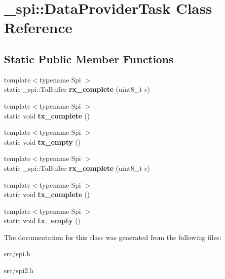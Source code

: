 \hypertarget{class__spi_1_1DataProviderTask}{}\section{\+\_\+spi\+:\+:Data\+Provider\+Task Class Reference}
\label{class__spi_1_1DataProviderTask}
\subsection*{Static Public Member Functions}
\begin{DoxyCompactItemize}
\item 
\hypertarget{class__spi_1_1DataProviderTask_a5f3759905dd157be3c7b42b1f77c160c}{}\label{class__spi_1_1DataProviderTask_a5f3759905dd157be3c7b42b1f77c160c} 
{\footnotesize template$<$typename Spi $>$ }\\static \+\_\+spi\+::\+To\+Buffer {\bfseries rx\+\_\+complete} (uint8\+\_\+t c)
\item 
\hypertarget{class__spi_1_1DataProviderTask_a3211b16d267b3e977ebf44e7158cca61}{}\label{class__spi_1_1DataProviderTask_a3211b16d267b3e977ebf44e7158cca61} 
{\footnotesize template$<$typename Spi $>$ }\\static void {\bfseries tx\+\_\+complete} ()
\item 
\hypertarget{class__spi_1_1DataProviderTask_ad9812d5db693664f54bcaee1152e4d6b}{}\label{class__spi_1_1DataProviderTask_ad9812d5db693664f54bcaee1152e4d6b} 
{\footnotesize template$<$typename Spi $>$ }\\static void {\bfseries tx\+\_\+empty} ()
\item 
\hypertarget{class__spi_1_1DataProviderTask_a5f3759905dd157be3c7b42b1f77c160c}{}\label{class__spi_1_1DataProviderTask_a5f3759905dd157be3c7b42b1f77c160c} 
{\footnotesize template$<$typename Spi $>$ }\\static \+\_\+spi\+::\+To\+Buffer {\bfseries rx\+\_\+complete} (uint8\+\_\+t c)
\item 
\hypertarget{class__spi_1_1DataProviderTask_a3211b16d267b3e977ebf44e7158cca61}{}\label{class__spi_1_1DataProviderTask_a3211b16d267b3e977ebf44e7158cca61} 
{\footnotesize template$<$typename Spi $>$ }\\static void {\bfseries tx\+\_\+complete} ()
\item 
\hypertarget{class__spi_1_1DataProviderTask_ad9812d5db693664f54bcaee1152e4d6b}{}\label{class__spi_1_1DataProviderTask_ad9812d5db693664f54bcaee1152e4d6b} 
{\footnotesize template$<$typename Spi $>$ }\\static void {\bfseries tx\+\_\+empty} ()
\end{DoxyCompactItemize}


The documentation for this class was generated from the following files\+:\begin{DoxyCompactItemize}
\item 
src/spi.\+h\item 
src/spi2.\+h\end{DoxyCompactItemize}
